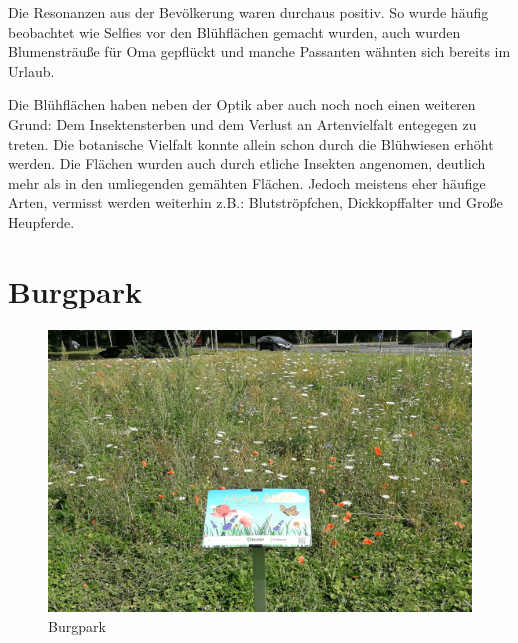 \documentclass[10pt]{article}
\begin{document}
Die Resonanzen aus der Bevölkerung waren durchaus positiv. So wurde häufig beobachtet wie Selfies vor den Blühflächen gemacht wurden, auch wurden Blumensträuße für Oma gepflückt und manche Passanten wähnten sich bereits im Urlaub.

Die Blühflächen haben neben der Optik aber auch noch noch einen weiteren Grund: Dem Insektensterben und dem Verlust an Artenvielfalt entegegen zu treten. Die botanische Vielfalt konnte allein schon durch die Blühwiesen erhöht werden. Die Flächen wurden auch durch etliche Insekten angenomen, deutlich mehr als in den umliegenden gemähten Flächen. Jedoch meistens eher häufige Arten, vermisst werden weiterhin z.B.: Blutströpfchen, Dickkopffalter und Große Heupferde.


\newpage

\section{Burgpark}

\begin{figure}[h!]
  \includegraphics[width=\linewidth]{img/infotafeln.jpg}
  \caption{Burgpark}
  \label{fig:boat1}
\end{figure}
\end{document}
